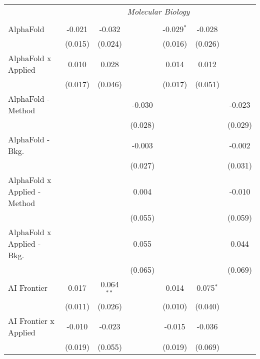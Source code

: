 \begin{tabular}{lcccccc}
 & \multicolumn{6}{c}{\textit{Molecular Biology}} \\ \\
   AlphaFold                      & -0.021  & -0.032         &         & -0.029$^{*}$ & -0.028        &   \\   
                                  & (0.015) & (0.024)        &         & (0.016)      & (0.026)       &   \\   
   AlphaFold x Applied            & 0.010   & 0.028          &         & 0.014        & 0.012         &   \\   
                                  & (0.017) & (0.046)        &         & (0.017)      & (0.051)       &   \\   
   AlphaFold - Method             &         &                & -0.030  &              &               & -0.023\\   
                                  &         &                & (0.028) &              &               & (0.029)\\   
   AlphaFold - Bkg.               &         &                & -0.003  &              &               & -0.002\\   
                                  &         &                & (0.027) &              &               & (0.031)\\   
   AlphaFold x Applied - Method   &         &                & 0.004   &              &               & -0.010\\   
                                  &         &                & (0.055) &              &               & (0.059)\\   
   AlphaFold x Applied - Bkg.     &         &                & 0.055   &              &               & 0.044\\   
                                  &         &                & (0.065) &              &               & (0.069)\\   
   AI Frontier                    & 0.017   & 0.064$^{**}$   &         & 0.014        & 0.075$^{*}$   &   \\   
                                  & (0.011) & (0.026)        &         & (0.010)      & (0.040)       &   \\   
   AI Frontier x Applied          & -0.010  & -0.023         &         & -0.015       & -0.036        &   \\   
                                  & (0.019) & (0.055)        &         & (0.019)      & (0.069)       &   \\   

\end{tabular}
